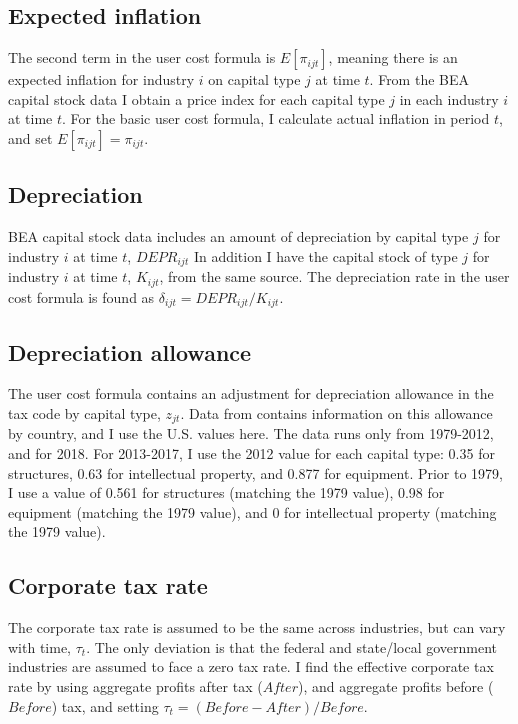 \documentclass[11pt]{article}
\begin{document}
\subsection{Expected inflation}
The second term in the user cost formula is $E[\pi_{ijt}]$, meaning there is an expected inflation for industry $i$ on capital type $j$ at time $t$. From the BEA capital stock data \citep{beacap} I obtain a price index for each capital type $j$ in each industry $i$ at time $t$. For the basic user cost formula, I calculate actual inflation in period $t$, and set $E[\pi_{ijt}] = \pi_{ijt}$.

\subsection{Depreciation}
BEA capital stock data \citep{beacap} includes an amount of depreciation by capital type $j$ for industry $i$ at time $t$, $DEPR_{ijt}$ In addition I have the capital stock of type $j$ for industry $i$ at time $t$, $K_{ijt}$, from the same source. The depreciation rate in the user cost formula is found as $\delta_{ijt} = DEPR_{ijt}/K_{ijt}$.

\subsection{Depreciation allowance}
The user cost formula contains an adjustment for depreciation allowance in the tax code by capital type, $z_{jt}$. Data from \cite{stan} contains information on this allowance by country, and I use the U.S. values here. The data runs only from 1979-2012, and for 2018. For 2013-2017, I use the 2012 value for each capital type: 0.35 for structures, 0.63 for intellectual property, and 0.877 for equipment. Prior to 1979, I use a value of 0.561 for structures (matching the 1979 value), 0.98 for equipment (matching the 1979 value), and 0 for intellectual property (matching the 1979 value). 

\subsection{Corporate tax rate}
The corporate tax rate is assumed to be the same across industries, but can vary with time, $\tau_t$. The only deviation is that the federal and state/local government industries are assumed to face a zero tax rate. I find the effective corporate tax rate by using aggregate profits after tax ($After$), and aggregate profits before ($Before$) tax, and setting $\tau_t = (Before - After)/Before$. 
\end{document}
